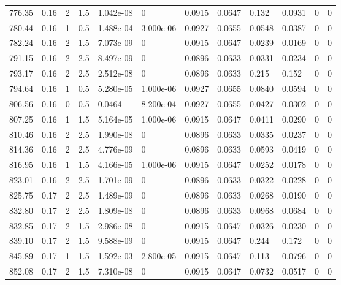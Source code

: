 \documentclass[preview]{standalone}
\begin{document}
{{{{{\begin{tabular}{L{1.2cm}C{1.2cm} C{0.3cm}C{0.5cm} C{1.4cm}C{1.4cm} C{1.4cm}C{1.4cm} C{1.6cm}C{1.6cm} C{1.6cm}C{1.6cm}}
  776.35  &  0.16  & 2     & 1.5 &  1.042e-08  & 0  &  0.0915&   0.0647& 0.132 & 0.0931   &  0 & 0  \\ 
  780.44  &  0.16  & 1     & 0.5 &  1.488e-04  & 3.000e-06  &  0.0927&   0.0655& 0.0548 & 0.0387   &  0 & 0  \\ 
  782.24  &  0.16  & 2     & 1.5 &  7.073e-09  & 0  &  0.0915&   0.0647& 0.0239 & 0.0169   &  0 & 0  \\ 
  791.15  &  0.16  & 2     & 2.5 &  8.497e-09  & 0  &  0.0896&   0.0633& 0.0331 & 0.0234   &  0 & 0  \\ 
  793.17  &  0.16  & 2     & 2.5 &  2.512e-08  & 0  &  0.0896&   0.0633& 0.215 & 0.152   &  0 & 0  \\ 
  794.64  &  0.16  & 1     & 0.5 &  5.280e-05  & 1.000e-06  &  0.0927&   0.0655& 0.0840 & 0.0594   &  0 & 0  \\ 
  806.56  &  0.16  & 0     & 0.5 &  0.0464  & 8.200e-04  &  0.0927&   0.0655& 0.0427 & 0.0302   &  0 & 0  \\ 
  807.25  &  0.16  & 1     & 1.5 &  5.164e-05  & 1.000e-06  &  0.0915&   0.0647& 0.0411 & 0.0290   &  0 & 0  \\ 
  810.46  &  0.16  & 2     & 2.5 &  1.990e-08  & 0  &  0.0896&   0.0633& 0.0335 & 0.0237   &  0 & 0  \\ 
  814.36  &  0.16  & 2     & 2.5 &  4.776e-09  & 0  &  0.0896&   0.0633& 0.0593 & 0.0419   &  0 & 0  \\ 
  816.95  &  0.16  & 1     & 1.5 &  4.166e-05  & 1.000e-06  &  0.0915&   0.0647& 0.0252 & 0.0178   &  0 & 0  \\ 
  823.01  &  0.16  & 2     & 2.5 &  1.701e-09  & 0  &  0.0896&   0.0633& 0.0322 & 0.0228   &  0 & 0  \\ 
  825.75  &  0.17  & 2     & 2.5 &  1.489e-09  & 0  &  0.0896&   0.0633& 0.0268 & 0.0190   &  0 & 0  \\ 
  832.80  &  0.17  & 2     & 2.5 &  1.809e-08  & 0  &  0.0896&   0.0633& 0.0968 & 0.0684   &  0 & 0  \\ 
  832.85  &  0.17  & 2     & 1.5 &  2.986e-08  & 0  &  0.0915&   0.0647& 0.0326 & 0.0230   &  0 & 0  \\ 
  839.10  &  0.17  & 2     & 1.5 &  9.588e-09  & 0  &  0.0915&   0.0647& 0.244 & 0.172   &  0 & 0  \\ 
  845.89  &  0.17  & 1     & 1.5 &  1.592e-03  & 2.800e-05  &  0.0915&   0.0647& 0.113 & 0.0796   &  0 & 0  \\ 
  852.08  &  0.17  & 2     & 1.5 &  7.310e-08  & 0  &  0.0915&   0.0647& 0.0732 & 0.0517   &  0 & 0  \\ 

\end{tabular}}}}}}
\end{document}
